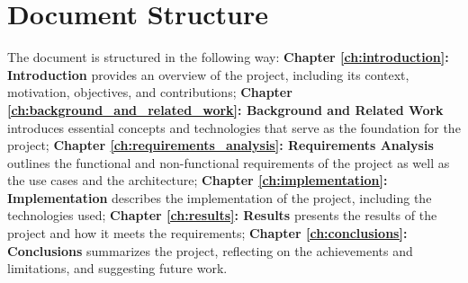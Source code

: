 \section{Document Structure}
\label{sec:document_structure}

The document is structured in the following way: \textbf{Chapter
    \ref{ch:introduction}: Introduction} provides an overview of the project,
including its context, motivation, objectives, and contributions;
\textbf{Chapter \ref{ch:background_and_related_work}: Background and Related
    Work} introduces essential concepts and technologies that serve as the
foundation for the project; \textbf{Chapter \ref{ch:requirements_analysis}:
    Requirements Analysis} outlines the functional and non-functional requirements
of the project as well as the use cases and the architecture; \textbf{Chapter
    \ref{ch:implementation}: Implementation} describes the implementation of the
project, including the technologies used; \textbf{Chapter \ref{ch:results}:
    Results} presents the results of the project and how it meets the requirements;
\textbf{Chapter \ref{ch:conclusions}: Conclusions} summarizes the project,
reflecting on the achievements and limitations, and suggesting future work.
